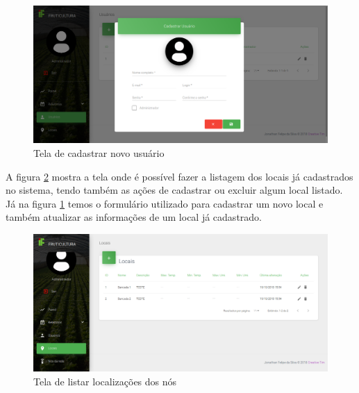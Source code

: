 \begin{figure}[H]
    \centering
    \includegraphics[scale=0.3]{04-figuras/tela_cadastrar_usuario.png}
    \caption{Tela de cadastrar novo usuário}
    \vspace{-\baselineskip}
    \label{fig:tela-cadastrar-usuario}
\end{figure}

A figura \ref{fig:tela-listar-locais} mostra a tela onde é possível fazer a listagem dos locais já cadastrados no sistema, tendo também as ações de cadastrar ou excluir algum local listado. Já na figura \ref{fig:tela-cadastrar-usuario} temos o formulário utilizado para cadastrar um novo local e também atualizar as informações de um local já cadastrado.

\begin{figure}[H]
    \centering
    \includegraphics[scale=0.3]{04-figuras/tela_lista_locais.png}
    \caption{Tela de listar localizações dos nós}
    \vspace{-\baselineskip}
    \label{fig:tela-listar-locais}
\end{figure}


